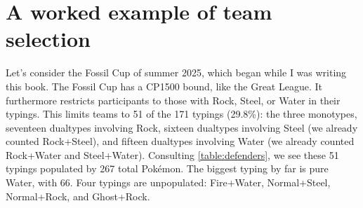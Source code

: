 \chapter{A worked example of team selection}
\label{chap:example}

Let's consider the Fossil Cup of summer 2025, which began while I was writing this book.
The Fossil Cup has a CP1500 bound, like the Great League.
It furthermore restricts participants to those with Rock, Steel, or Water in their typings.
This limits teams to 51 of the 171 typings (29.8\%): the three monotypes, seventeen dualtypes
 involving Rock, sixteen dualtypes involving Steel (we already counted Rock+Steel), and
 fifteen dualtypes involving Water (we already counted Rock+Water and Steel+Water).
Consulting \autoref{table:defenders}, we see these 51 typings populated by 267 total Pokémon.
The biggest typing by far is pure Water, with 66.
Four typings are unpopulated: Fire+Water, Normal+Steel, Normal+Rock, and Ghost+Rock.
